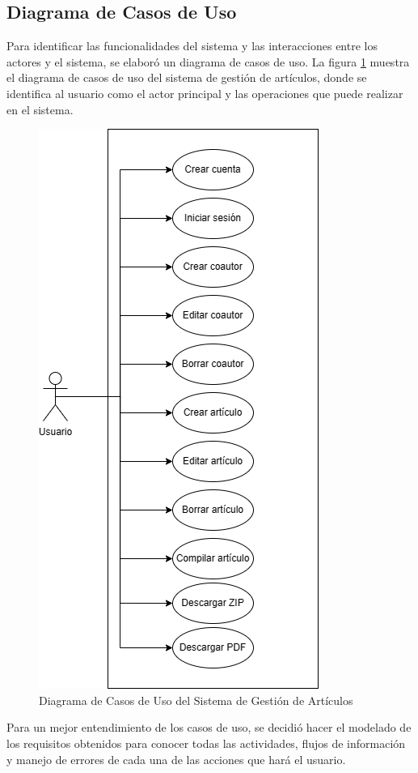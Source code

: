 \subsection{Diagrama de Casos de Uso}
Para identificar las funcionalidades del sistema y las interacciones entre los actores y el sistema, se elaboró un diagrama de casos de uso. La figura \ref{fig:casos-uso} muestra el diagrama de casos de uso del sistema de gestión de artículos, donde se identifica al usuario como el actor principal y las operaciones que puede realizar en el sistema. 

\begin{figure}[H]
    \centering
    \includegraphics[scale=0.5]{IMAGENES/caso-uso.png}
    \caption{Diagrama de Casos de Uso del Sistema de Gestión de Artículos}
    \label{fig:casos-uso}
\end{figure}

Para un mejor entendimiento de los casos de uso, se decidió hacer el modelado de los requisitos obtenidos para conocer todas las actividades, flujos de información y manejo de errores de cada una de las acciones que hará el usuario.

